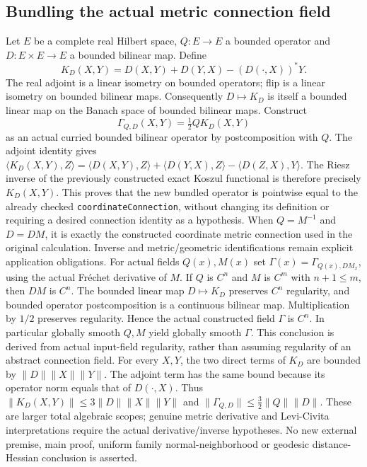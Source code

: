\documentclass[11pt]{article}
\theoremstyle{definition}
\theoremstyle{remark}
\numberwithin{equation}{section}
\begin{document}
\subsection{Bundling the actual metric connection field}
\label{expanded:metric-connection-bundle}
Let $E$ be a complete real Hilbert space, $Q:E\to E$ a bounded operator and
$D:E\times E\to E$ a bounded bilinear map. Define
\[
 K_D(X,Y)=D(X,Y)+D(Y,X)-(D(\cdot,X))^*Y.
\]
The real adjoint is a linear isometry on bounded operators; flip is a linear
isometry on bounded bilinear maps. Consequently $D\mapsto K_D$ is itself a
bounded linear map on the Banach space of bounded bilinear maps. Construct
\[
 \Gamma_{Q,D}(X,Y)=\tfrac12 Q K_D(X,Y)
\]
as an actual curried bounded bilinear operator by postcomposition with $Q$.
The adjoint identity gives
$\langle K_D(X,Y),Z\rangle
 =\langle D(X,Y),Z\rangle+\langle D(Y,X),Z\rangle-
 \langle D(Z,X),Y\rangle$.
The Riesz inverse of the previously constructed exact Koszul functional is
therefore precisely $K_D(X,Y)$. This proves that the new bundled operator
is pointwise equal to the already checked \texttt{coordinateConnection},
without changing its definition or requiring a desired connection identity
as a hypothesis. When $Q=M^{-1}$ and $D=DM$, it is exactly the constructed
coordinate metric connection used in the original calculation. Inverse and
metric/geometric identifications remain explicit application obligations.
\label{expanded:metric-connection-field-regularity}
For actual fields $Q(x),M(x)$ set
$\Gamma(x)=\Gamma_{Q(x),DM_x}$, using the actual Fr\'echet derivative of $M$.
If $Q$ is $C^n$ and $M$ is $C^m$ with $n+1\le m$, then $DM$ is $C^n$.
The bounded linear map $D\mapsto K_D$ preserves $C^n$ regularity, and bounded
operator postcomposition is a continuous bilinear map. Multiplication by
$1/2$ preserves regularity. Hence the actual constructed field $\Gamma$ is
$C^n$. In particular globally smooth $Q,M$ yield globally smooth $\Gamma$.
This conclusion is derived from actual input-field regularity, rather than
assuming regularity of an abstract connection field.
\label{expanded:metric-connection-norm}
For every $X,Y$, the two direct terms of $K_D$ are bounded by
$\|D\|\|X\|\|Y\|$. The adjoint term has the same bound because its operator
norm equals that of $D(\cdot,X)$. Thus
$\|K_D(X,Y)\|\le3\|D\|\|X\|\|Y\|$ and
$\|\Gamma_{Q,D}\|\le\tfrac32\|Q\|\|D\|$.
These are larger total algebraic scopes; genuine metric derivative and
Levi-Civita interpretations require the actual derivative/inverse hypotheses.
No new external premise, main proof, uniform family normal-neighborhood or
geodesic distance-Hessian conclusion is asserted.
\end{document}
